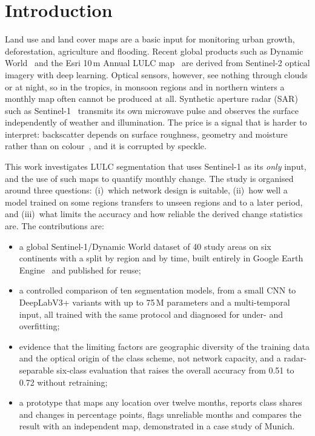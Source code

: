 \documentclass[12pt,conference]{IEEEtran}
\begin{document}
\section{Introduction}

Land use and land cover maps are a basic input for monitoring urban growth, deforestation, agriculture and
flooding. Recent global products such as Dynamic World~\cite{brown2022dynamic} and the Esri 10\,m Annual LULC
map~\cite{karra2021global} are derived from Sentinel-2 optical imagery with deep learning. Optical sensors, however, see nothing through clouds or at night, so in the tropics, in monsoon
regions and in northern winters a monthly map often cannot be produced at all. Synthetic aperture radar (SAR) such as
Sentinel-1~\cite{torres2012gmes} transmits its own microwave pulse and observes the surface independently of weather
and illumination. The price is a signal that is harder to interpret: backscatter depends on surface roughness,
geometry and moisture rather than on colour~\cite{ulaby2014microwave}, and it is corrupted by speckle.

This work investigates LULC segmentation that uses Sentinel-1 as its \emph{only} input, and the use of such maps to
quantify monthly change. The study is organised around three questions: (i)~which network design is suitable, (ii)~how
well a model trained on some regions transfers to unseen regions and to a later period, and (iii)~what limits the
accuracy and how reliable the derived change statistics are. The contributions are:
\begin{itemize}
\item a global Sentinel-1/Dynamic World dataset of 40 study areas on six continents with a split by region and by
time, built entirely in Google Earth Engine~\cite{gorelick2017google} and published for reuse;
\item a controlled comparison of ten segmentation models, from a small CNN to DeepLabV3+ variants with up to 75\,M
parameters and a multi-temporal input, all trained with the same protocol and diagnosed for under- and overfitting;
\item evidence that the limiting factors are geographic diversity of the training data and the optical origin of the
class scheme, not network capacity, and a radar-separable six-class evaluation that raises the overall accuracy from
0.51 to 0.72 without retraining;
\item a prototype that maps any location over twelve months, reports class shares and changes in percentage points,
flags unreliable months and compares the result with an independent map, demonstrated in a case study of Munich.
\end{itemize}
\end{document}
